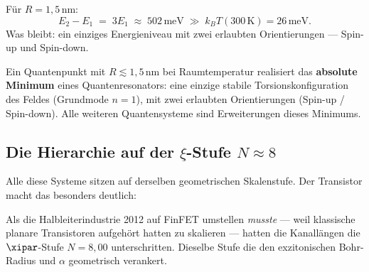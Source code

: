 Für $R = 1{,}5$\,nm:
\begin{equation}
  E_2 - E_1 \;=\; 3 E_1 \;\approx\; 502\,\text{meV}
  \;\gg\; k_BT(300\,\text{K}) = 26\,\text{meV.}
\end{equation}
Was bleibt: ein einziges Energieniveau mit zwei erlaubten
Orientierungen --- Spin-up und Spin-down.

\begin{foundation}
Ein Quantenpunkt mit $R \lesssim 1{,}5$\,nm bei Raumtemperatur
realisiert das \textbf{absolute Minimum} eines Quantenresonators:
eine einzige stabile Torsionskonfiguration des Feldes (Grundmode $n=1$),
mit zwei erlaubten Orientierungen (Spin-up / Spin-down).
Alle weiteren Quantensysteme sind Erweiterungen dieses Minimums.
\end{foundation}

\subsection{Die Hierarchie auf der \texorpdfstring{$\xi$}{xi}-Stufe
  \texorpdfstring{$N \approx 8$}{N~8}}

Alle diese Systeme sitzen auf derselben geometrischen Skalenstufe.
Der Transistor macht das besonders deutlich:

\begin{center}
\end{center}

Als die Halbleiterindustrie 2012 auf FinFET umstellen \emph{musste}
--- weil klassische planare Transistoren aufgehört hatten zu skalieren
--- hatten die Kanallängen die $\xipar$-Stufe $N = 8{,}00$ unterschritten.
Dieselbe Stufe die den exzitonischen Bohr-Radius und $\alpha$
geometrisch verankert.

